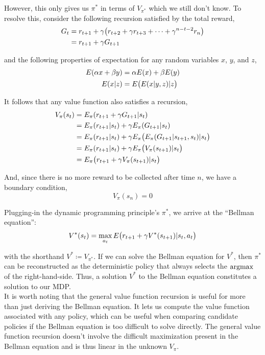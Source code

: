 However, this only gives us $\pi^*$ in terms of $V_{\pi^*}$ which we still don't know. To resolve this, consider the following recursion satisfied by the total reward,
\begin{align*}
G_t &= r_{t+1} + \gamma \big{(}r_{t+2} + \gamma r_{t+3} + \cdots + \gamma^{n-t-2} r_n\big{)}\\
&= r_{t+1} + \gamma G_{t+1}
\end{align*}

and the following properties of expectation for any random variables $x$, $y$, and $z$,
\begin{align*}
E(\alpha x + \beta y) &= \alpha E(x) + \beta E(y)\\
E(x | z) &= E\big{(}E(x | y, z) | z\big{)}
\end{align*}

It follows that any value function also satisfies a recursion,
\begin{align*}
V_\pi(s_t) &= E_\pi(r_{t+1} + \gamma G_{t+1} | s_t)\\
&= E_\pi(r_{t+1}|s_t) + \gamma E_\pi(G_{t+1} | s_t)\\
&= E_\pi(r_{t+1}|s_t) + \gamma E_\pi\big{(}E_\pi(G_{t+1}|s_{t+1},s_t) | s_t\big{)}\\
&= E_\pi(r_{t+1}|s_t) + \gamma E_\pi\big{(}V_{\pi}(s_{t+1}) | s_t\big{)}\\
&= E_\pi\big{(}r_{t+1} + \gamma V_{\pi}(s_{t+1}) | s_t\big{)}
\end{align*}

And, since there is no more reward to be collected after time $n$, we have a boundary condition,
\begin{equation*}
V_{\pi}(s_n) = 0
\end{equation*}

Plugging-in the dynamic programming principle's $\pi^*$, we arrive at the ``Bellman equation'':
\begin{equation*}
V^*(s_t) = \max_{a_t} E\big{(}r_{t+1} + \gamma V^*(s_{t+1}) | s_t, a_t\big{)}
\end{equation*}

with the shorthand $V^* \coloneqq V_{\pi^*}$. If we can solve the Bellman equation for $V^*$, then $\pi^*$ can be reconstructed as the deterministic policy that always selects the $\operatorname*{argmax}$ of the right-hand-side. Thus, a solution $V^*$ to the Bellman equation constitutes a solution to our MDP.\\

It is worth noting that the general value function recursion is useful for more than just deriving the Bellman equation. It lets us compute the value function associated with any policy, which can be useful when comparing candidate policies if the Bellman equation is too difficult to solve directly. The general value function recursion doesn't involve the difficult maximization present in the Bellman equation and is thus linear in the unknown $V_\pi$.\\

